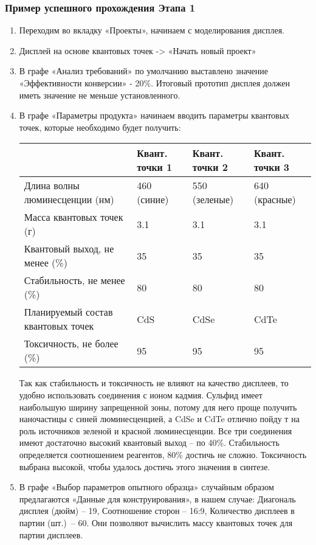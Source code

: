 \subsubsection*{Пример успешного прохождения Этапа 1}

\begin{enumerate}
    \item Переходим во вкладку «Проекты», начинаем с моделирования дисплея.
    \item Дисплей на основе квантовых точек -> «Начать новый проект»
    \item В графе «Анализ требований» по умолчанию выставлено значение «Эффективности конверсии» - 20\%. Итоговый прототип дисплея должен иметь значение не меньше установленного.
    \item В графе «Параметры продукта» начинаем вводить параметры квантовых точек, которые необходимо будет получить:
    
    \begin{table}[H]
        \center
        \begin{tabular}{|p{3.5cm}|p{2.8cm}|p{2.8cm}|p{2.8cm}|}
            \hline
            &Квант. точки 1	&Квант. точки 2	&Квант. точки 3 \\
            \hline
            Длина волны люминесценции (нм)	&460 (синие)	&550 (зеленые)	&640 (красные) \\
            \hline
            Масса квантовых точек (г)	&3.1	&3.1	&3.1 \\
            \hline
            Квантовый выход, не менее (\%)	&35&	35&	35 \\
            \hline
            Стабильность, не менее (\%)&	80&	80&	80 \\
            \hline
            Планируемый состав квантовых точек&	CdS&CdSe&	CdTe \\
            \hline
            Токсичность, не более (\%)	&95	&95&	95 \\
            \hline
        \end{tabular}
    \end{table}

    Так как стабильность и токсичность не влияют на качество дисплеев, то удобно использовать соединения с ионом кадмия. Сульфид имеет наибольшую ширину запрещенной зоны, потому для него проще получить наночастицы с синей люминесценцией, а CdSe и CdTe отлично пойду т на роль источников зеленой и красной люминесценции. Все три соединения имеют достаточно высокий квантовый выход – по 40\%. Стабильность определяется соотношением реагентов, 80\% достичь не сложно. Токсичность выбрана высокой, чтобы удалось достичь этого значения в синтезе.
    \item В графе «Выбор параметров опытного образца» случайным образом предлагаются «Данные для конструирования», в нашем случае: Диагональ дисплея (дюйм) – 19, Соотношение сторон – 16:9, Количество дисплеев в партии (шт.)~– 60. Они позволяют вычислить массу квантовых точек для партии дисплеев.
    

\end{enumerate}
